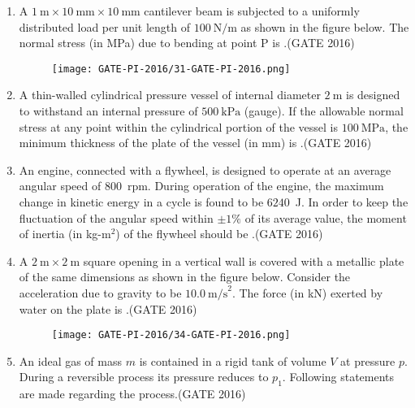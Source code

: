 \documentclass[journal,12pt,onecolumn]{IEEEtran}
\theoremstyle{remark}
\begin{document}
\begin{enumerate}
\item A $1~\text{m} \times 10~\text{mm} \times 10~\text{mm}$ cantilever beam is subjected to a uniformly distributed load per unit length of $100~\text{N/m}$ as shown in the figure below. The normal stress (in MPa) due to bending at point P is \underline{\hspace{2cm}}.\hfill{(GATE 2016)}
\begin{figure}[h!]
    \centering
    
    \texttt{[image: GATE-PI-2016/31-GATE-PI-2016.png]}
    \caption{}
    \label{q31}
\end{figure}
\vspace{0.5cm}

\item A thin-walled cylindrical pressure vessel of internal diameter $2~\text{m}$ is designed to withstand an internal pressure of $500~\text{kPa}$ (gauge). If the allowable normal stress at any point within the cylindrical portion of the vessel is $100~\text{MPa}$, the minimum thickness of the plate of the vessel (in mm) is \underline{\hspace{2cm}}.\hfill{(GATE 2016)}
\vspace{0.5cm}

\item An engine, connected with a flywheel, is designed to operate at an average angular speed of $800$~rpm. During operation of the engine, the maximum change in kinetic energy in a cycle is found to be $6240$~J. In order to keep the fluctuation of the angular speed within $\pm1\%$ of its average value, the moment of inertia (in kg-m$^{2}$) of the flywheel should be \underline{\hspace{2cm}}.\hfill{(GATE 2016)}
\vspace{0.5cm}
\newpage
\item A $2~\text{m} \times 2~\text{m}$ square opening in a vertical wall is covered with a metallic plate of the same dimensions as shown in the figure below. Consider the acceleration due to gravity to be $10.0~\text{m/s}^{2}$. The force (in kN) exerted by water on the plate is \underline{\hspace{2cm}}.\hfill{(GATE 2016)}
\begin{figure}[h!]
    \centering
    
    \texttt{[image: GATE-PI-2016/34-GATE-PI-2016.png]}
    \caption{}
    \label{q34}
    \end{figure}
\newpage
\item An ideal gas of mass $m$ is contained in a rigid tank of volume $V$ at pressure $p$. During a reversible process its pressure reduces to $p_1$. Following statements are made regarding the process.\hfill{(GATE 2016)}


\end{enumerate}
\end{document}
